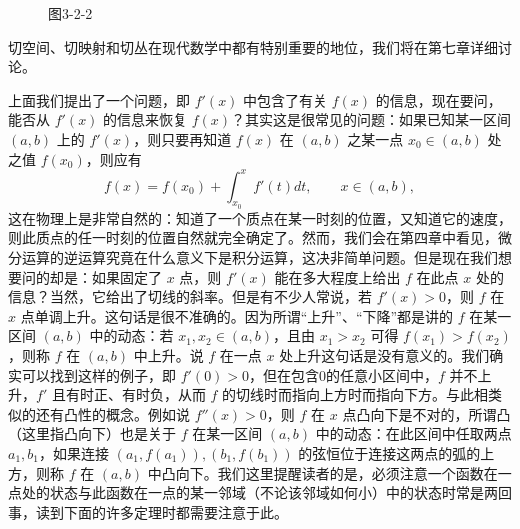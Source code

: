 \begin{figure}[htbp]
\centering
{}
\caption*{图3-2-2}
\end{figure}

切空间、切映射和切丛在现代数学中都有特别重要的地位，我们将在第七章详细讨论。

上面我们提出了一个问题，即 $f'(x)$ 中包含了有关 $f(x)$ 的信息，现在要问，能否从 $f'(x)$ 的信息来恢复 $f(x)$？其实这是很常见的问题：如果已知某一区间 $(a,b)$ 上的 $f'(x)$，则只要再知道 $f(x)$ 在 $(a,b)$ 之某一点 $x_0\in(a,b)$ 处之值 $f(x_0)$，则应有
\[
 f(x)=f(x_0)+\int_{x_0}^x f'(t)dt,\qquad x\in(a,b),
\]
这在物理上是非常自然的：知道了一个质点在某一时刻的位置，又知道它的速度，则此质点的任一时刻的位置自然就完全确定了。然而，我们会在第四章中看见，微分运算的逆运算究竟在什么意义下是积分运算，这决非简单问题。但是现在我们想要问的却是：如果固定了 $x$ 点，则 $f'(x)$ 能在多大程度上给出 $f$ 在此点 $x$ 处的信息？当然，它给出了切线的斜率。但是有不少人常说，若 $f'(x)>0$，则 $f$ 在 $x$ 点单调上升。这句话是很不准确的。因为所谓“上升”、“下降”都是讲的 $f$ 在某一区间 $(a,b)$ 中的动态：若 $x_1,x_2\in(a,b)$，且由 $x_1>x_2$ 可得 $f(x_1)>f(x_2)$，则称 $f$ 在 $(a,b)$ 中上升。说 $f$ 在一点 $x$ 处上升这句话是没有意义的。我们确实可以找到这样的例子，即 $f'(0)>0$，但在包含0的任意小区间中，$f$ 并不上升，$f'$ 且有时正、有时负，从而 $f$ 的切线时而指向上方时而指向下方。与此相类似的还有凸性的概念。例如说 $f''(x)>0$，则 $f$ 在 $x$ 点凸向下是不对的，所谓凸（这里指凸向下）也是关于 $f$ 在某一区间 $(a,b)$ 中的动态：在此区间中任取两点 $a_1,b_1$，如果连接 $(a_1,f(a_1)),(b_1,f(b_1))$ 的弦恒位于连接这两点的弧的上方，则称 $f$ 在 $(a,b)$ 中凸向下。我们这里提醒读者的是，必须注意一个函数在一点处的状态与此函数在一点的某一邻域（不论该邻域如何小）中的状态时常是两回事，读到下面的许多定理时都需要注意于此。

